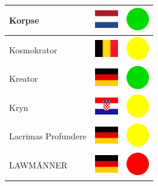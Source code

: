 \documentclass[12pt, a4paper, twoside]{report}
\begin{document}
\begin{center}
\begin{longtable}{|p{5cm}|p{2cm}|p{2cm}|}
Korpse & \includegraphics[width=1cm]{4x3/nl} & \includegraphics[width=1cm]{likes/y} \\ \hline
Kosmokrator & \includegraphics[width=1cm]{4x3/be} & \includegraphics[width=1cm]{likes/m} \\ \hline
Kreator & \includegraphics[width=1cm]{4x3/de} & \includegraphics[width=1cm]{likes/y} \\ \hline
Kryn & \includegraphics[width=1cm]{4x3/hr} & \includegraphics[width=1cm]{likes/m} \\ \hline
Lacrimas Profundere & \includegraphics[width=1cm]{4x3/de} & \includegraphics[width=1cm]{likes/m} \\ \hline
LAWMÄNNER & \includegraphics[width=1cm]{4x3/de} & \includegraphics[width=1cm]{likes/n} \\ \hline

\end{longtable}
\end{center}
\end{document}
